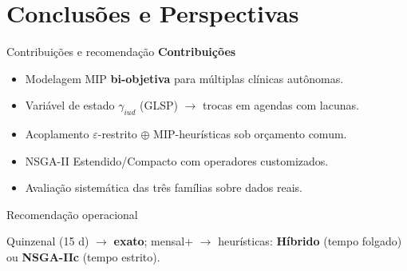 \section{Conclusões e Perspectivas}


\begin{frame}{Contribuições e recomendação}
    \textbf{Contribuições}
    \begin{footnotesize}
        \begin{itemize}
            \item Modelagem MIP \textbf{bi-objetiva} para múltiplas clínicas autônomas.
            \item Variável de estado \(\gamma_{iud}\) (GLSP) \(\rightarrow\) trocas em agendas com lacunas.
            \item Acoplamento \(\varepsilon\)-restrito \(\oplus\) MIP-heurísticas sob orçamento comum.
            \item NSGA-II Estendido/Compacto com operadores customizados.
            \item Avaliação sistemática das três famílias sobre dados reais.
        \end{itemize}
    \end{footnotesize}

    \begingroup
    \begin{block}{Recomendação operacional}
        \begin{footnotesize}
            Quinzenal (15 d) \(\rightarrow\) \textbf{exato}; mensal+ \(\rightarrow\) heurísticas: \textbf{Híbrido} (tempo folgado) ou \textbf{NSGA-IIc} (tempo estrito).
        \end{footnotesize}
    \end{block}
    \endgroup
\end{frame}

